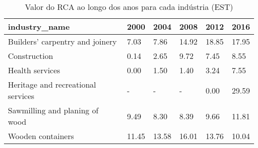 \begin{table}
\centering
\caption{Valor do RCA ao longo dos anos para cada indústria (EST)}
\begin{tabular}{p{6cm}p{1.5cm}p{1.5cm}p{1.5cm}p{1.5cm}p{1.5cm}}
\toprule
                     industry\_name &  2000 &  2004 &  2008 &  2012 &  2016 \\
\midrule
   Builders' carpentry and joinery &  7.03 &  7.86 & 14.92 & 18.85 & 17.95 \\
                      Construction &  0.14 &  2.65 &  9.72 &  7.45 &  8.55 \\
                   Health services &  0.00 &  1.50 &  1.40 &  3.24 &  7.55 \\
Heritage and recreational services &     - &     - &     - &  0.00 & 29.59 \\
    Sawmilling and planing of wood &  9.49 &  8.30 &  8.39 &  9.66 & 11.81 \\
                 Wooden containers & 11.45 & 13.58 & 16.01 & 13.76 & 10.04 \\
\bottomrule
\end{tabular}
\end{table}

